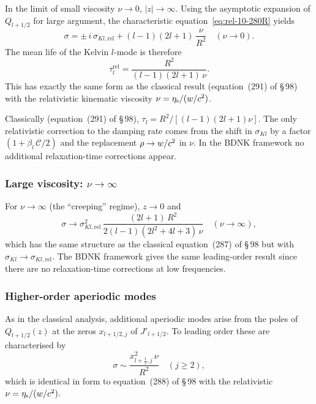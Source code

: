 In the limit of small viscosity $\nu\to 0$,
$|z|\to\infty$.  Using the asymptotic expansion of
$Q_{l+1/2}$ for large argument, the characteristic
equation~\eqref{eq:rel-10-280R} yields
\begin{equation}\label{eq:rel-10-290R}
  \sigma
  = \pm\,i\,\sigma_{Kl,\mathrm{rel}}
    + (l-1)(2l+1)\,\frac{\nu}{R^{2}}
  \quad (\nu\to 0).
\end{equation}
The mean life of the Kelvin $l$-mode is therefore
\begin{equation}\label{eq:rel-10-291R}
  \boxed{
  \tau_{l}^{\mathrm{rel}}
  = \frac{R^{2}}{(l-1)(2l+1)\,\nu}.
  }
\end{equation}
This has exactly the same form as the classical result
(equation~(291) of \S\,98) with the relativistic kinematic
viscosity $\nu = \eta_{\mathrm{s}}/(w/c^2)$.

\begin{relcorrection}
Classically (equation~(291) of \S\,98),
$\tau_{l} = R^{2}/[(l-1)(2l+1)\nu]$.
The only relativistic correction to the damping rate comes from
the shift in $\sigma_{Kl}$ by a factor
$(1 + \beta_{l}\,\mathcal{C}/2)$ and the replacement
$\rho \to w/c^2$ in $\nu$.  In the BDNK framework no
additional relaxation-time corrections appear.
\end{relcorrection}

\subsubsection*{Large viscosity: $\nu\to\infty$}

For $\nu\to\infty$ (the ``creeping'' regime),
$z\to 0$ and
\begin{equation}\label{eq:rel-10-287R}
  \sigma \to
  \sigma_{Kl,\mathrm{rel}}^{2}\,
  \frac{(2l+1)\,R^{2}}{2(l-1)(2l^{2}+4l+3)\,\nu}
  \quad (\nu\to\infty),
\end{equation}
which has the same structure as the classical
equation~(287) of \S\,98 but with
$\sigma_{Kl}\to\sigma_{Kl,\mathrm{rel}}$.  The BDNK framework gives the same leading-order result since
there are no relaxation-time corrections at low frequencies.

\subsubsection*{Higher-order aperiodic modes}

As in the classical analysis, additional aperiodic modes arise
from the poles of $Q_{l+1/2}(z)$ at the zeros
$x_{l+1/2,j}$ of $J'_{l+1/2}$.  To leading order these are
characterised by
\begin{equation}\label{eq:rel-10-288R}
  \sigma \sim
  \frac{x_{l+\frac{1}{2},j}^{2}\,\nu}{R^{2}}
  \quad (j \geqslant 2),
\end{equation}
which is identical in form to equation~(288) of \S\,98 with the
relativistic $\nu = \eta_{\mathrm{s}}/(w/c^2)$.

